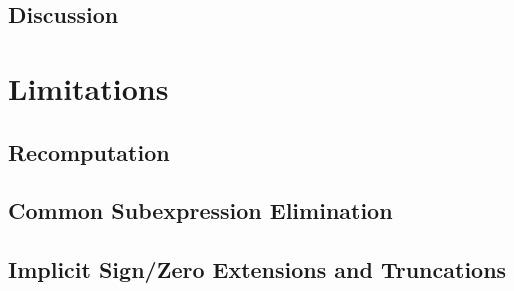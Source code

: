 \subsection{Discussion}


\section{Limitations}

\subsection{Recomputation}
\subsection{Common Subexpression Elimination}
\subsection{Implicit Sign/Zero Extensions and Truncations}
